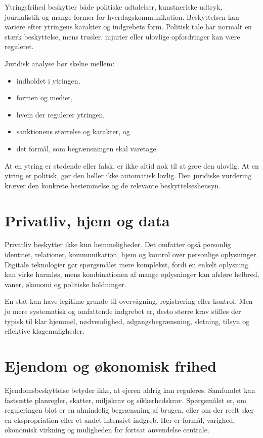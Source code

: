 Ytringsfrihed beskytter både politiske udtalelser, kunstneriske udtryk, journalistik og mange former for hverdagskommunikation. Beskyttelsen kan variere efter ytringens karakter og indgrebets form. Politisk tale har normalt en stærk beskyttelse, mens trusler, injurier eller ulovlige opfordringer kan være reguleret.

Juridisk analyse bør skelne mellem:
\begin{itemize}
  \item indholdet i ytringen,
  \item formen og mediet,
  \item hvem der regulerer ytringen,
  \item sanktionens størrelse og karakter, og
  \item det formål, som begrænsningen skal varetage.
\end{itemize}

At en ytring er stødende eller falsk, er ikke altid nok til at gøre den ulovlig. At en ytring er politisk, gør den heller ikke automatisk lovlig. Den juridiske vurdering kræver den konkrete bestemmelse og de relevante beskyttelseshensyn.

\section{Privatliv, hjem og data}

Privatliv beskytter ikke kun hemmeligheder. Det omfatter også personlig identitet, relationer, kommunikation, hjem og kontrol over personlige oplysninger. Digitale teknologier gør spørgsmålet mere komplekst, fordi en enkelt oplysning kan virke harmløs, mens kombinationen af mange oplysninger kan afsløre helbred, vaner, økonomi og politiske holdninger.

En stat kan have legitime grunde til overvågning, registrering eller kontrol. Men jo mere systematisk og omfattende indgrebet er, desto større krav stilles der typisk til klar hjemmel, nødvendighed, adgangsbegrænsning, sletning, tilsyn og effektive klagemuligheder.

\section{Ejendom og økonomisk frihed}

Ejendomsbeskyttelse betyder ikke, at ejeren aldrig kan reguleres. Samfundet kan fastsætte planregler, skatter, miljøkrav og sikkerhedskrav. Spørgsmålet er, om reguleringen blot er en almindelig begrænsning af brugen, eller om der reelt sker en ekspropriation eller et andet intensivt indgreb. Her er formål, varighed, økonomisk virkning og muligheden for fortsat anvendelse centrale.

